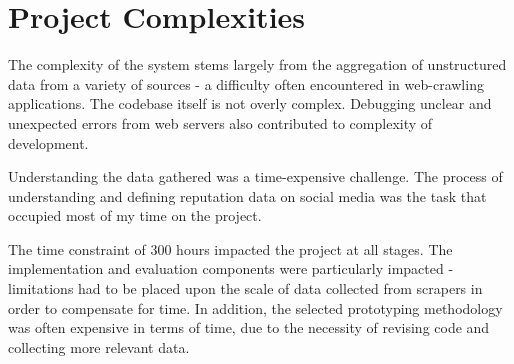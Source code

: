 
\section{Project Complexities}

The complexity of the system stems largely from the aggregation of unstructured data from a variety of sources - a difficulty often encountered in web-crawling applications. The codebase itself is not overly complex. Debugging unclear and unexpected errors from web servers also contributed to complexity of development.


Understanding the data gathered was a time-expensive challenge. The process of understanding and defining reputation data on social media was the task that occupied most of my time on the project. 

The time constraint of 300 hours impacted the project at all stages. The implementation and evaluation components were particularly impacted - limitations had to be placed upon the scale of data collected from scrapers in order to compensate for time. In addition, the selected prototyping methodology was often expensive in terms of time, due to the necessity of revising code and collecting more relevant data.




